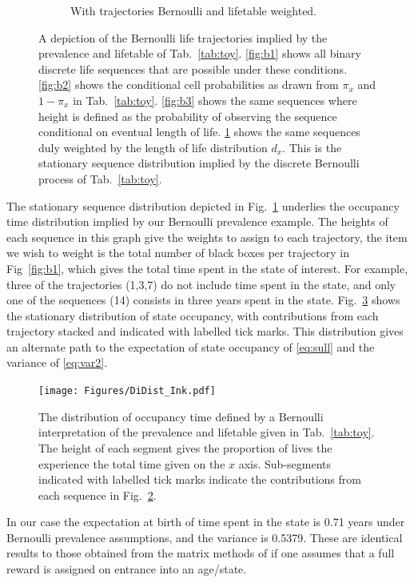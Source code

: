 \documentclass[a4paper]{article}
\begin{document}
\begin{figure}
\begin{subfigure}[b]{0.4\textwidth}
        \caption{With trajectories Bernoulli and lifetable weighted.\\}
        \label{fig:b4}
    \end{subfigure}
    \caption{A depiction of the Bernoulli life trajectories implied by the prevalence and lifetable of Tab.~\ref{tab:toy}. \ref{fig:b1} shows all binary discrete life sequences that are possible under these conditions. \ref{fig:b2} shows the conditional cell probabilities as drawn from $\pi_x$ and $1-\pi_x$ in Tab.~\ref{tab:toy}. \ref{fig:b3} shows the same sequences where height is defined as the probability of observing the sequence conditional on eventual length of life. \ref{fig:b4} shows the same sequences duly weighted by the length of life distribution $d_x$. This is the stationary sequence distribution implied by the discrete Bernoulli process of Tab.~\ref{tab:toy}. }\label{fig:bernexplain}
\end{figure}
\FloatBarrier

The stationary sequence distribution depicted in Fig.~\ref{fig:b4} underlies the occupancy time distribution implied by our Bernoulli prevalence example. The heights of each sequence in this graph give the weights to assign to each trajectory, the item we wish to weight is the total number of black boxes per trajectory in Fig~\ref{fig:b1}, which gives the total time spent in the state of interest. For example, three of the trajectories (1,3,7) do not include time spent in the state, and only one of the sequences (14) consists in three years spent in the state. Fig.~\ref{fig:DiDist} shows the stationary distribution of state occupancy, with contributions from each trajectory stacked and indicated with labelled tick marks. This distribution gives an alternate path to the expectation of state occupancy of \eqref{eq:sull} and the variance of \eqref{eq:var2}. 
\begin{figure}[ht!]
\centering
\texttt{[image: Figures/DiDist\_Ink.pdf]}
\caption{The distribution of occupancy time defined by a Bernoulli interpretation of the prevalence and lifetable given in Tab.~\ref{tab:toy}. The height of each segment gives the proportion of lives the experience the total time given on the $x$ axis. Sub-segments indicated with labelled tick marks indicate the contributions from each sequence in Fig.~\ref{fig:bernexplain}.}\label{fig:DiDist}
\end{figure}
\FloatBarrier

In our case the expectation at birth of time spent in the state is 0.71 years under Bernoulli prevalence assumptions, and the variance is 0.5379. These are identical results to those obtained from the matrix methods of \cite{caswell2018matrix} if one assumes that a full reward is assigned on entrance into an age/state.
\end{document}
